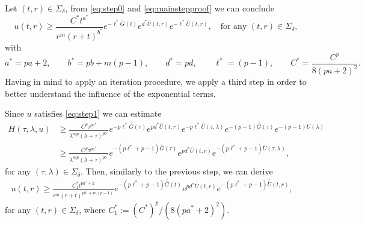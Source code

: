 \documentclass[11pt,reqno]{amsart}
\theoremstyle{definition}
\numberwithin{equation}{section}
\newcommand{\bbar}[1]{\bar{\bar{#1}}}
\begin{document}
Let $(t,r)\in \Sigma_\delta$, from \eqref{eq:step0} and \eqref{eq:mainstepproof} we can conclude
\begin{equation}
\label{eq:step1}
u(t,r)\geq \frac{C^*t^{a^*}}{r^m(r+t)^{b^*}}e^{-\ell^*\bbar{G}(t)} e^{d^*\bar{U}(t,r)} e^{-\ell^* \bbar{U}(t,r)}, \quad \text{for any }(t,r)\in\Sigma_\delta,
\end{equation}
with 
\begin{equation*}
a^*=pa+2, \hspace{2em} b^*=pb+m(p-1), \hspace{2em} d^*= pd, \hspace{2em} \ell^*=(p-1),  \hspace{2em} C^*=\frac{C^p}{8(pa+2)^2}.
%
\end{equation*}
%
Having in mind to apply an iteration procedure, we apply a third step in order to better understand the influence of the exponential terms. 



Since $u$ satisfies \eqref{eq:step1} we can estimate
%
\begin{align*}
H(\tau,\lambda, u)&\geq \frac{C^p\tau^{pa^*}}{\lambda^{mp}(\lambda+\tau)^{pb^*}}e^{-p\ell^*\bbar G(\tau)} e^{pd^*\bar{U}(t,r)}e^{-p\ell^* \bbar U(\tau,\lambda)}e^{-(p-1)\bbar G(\tau)} e^{-(p-1)U(\lambda)}\\
%
& \geq \frac{C^p\tau^{pa^*}}{\lambda^{mp}(\lambda+\tau)^{pb^*}}e^{-(p\ell^*+p-1)\bbar G(\tau)}e^{pd^*\bar{U}(t,r)}e^{-(p\ell^*+p-1)\bbar U(\tau,\lambda)},
\end{align*}
%
for any $(\tau, \lambda)\in \Sigma_\delta$.
Then, similarly to the previous step, we can derive
%
\begin{align}
\label{eq:step2}
u(t,r)\geq \frac{C_1^*t^{pa^*+2}}{r^m(r+t)^{pb^*+m(p-1)}}e^{-(p\ell^*+p-1)\bbar G(t)}e^{pd^*\bar U(t,r)}e^{-(p\ell^*+p-1) \bbar U(t, r)},\quad  
\end{align}
for any $(t,r)\in\Sigma_\delta$,
where $C^*_1:=(C^{*})^p/(8(pa^*+2)^2)$.
\end{document}
